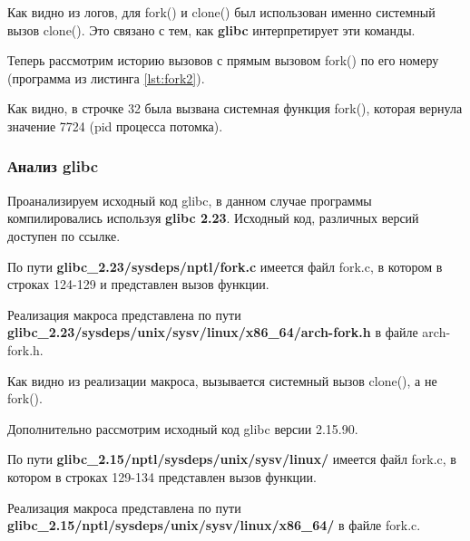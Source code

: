 Как видно из логов, для fork() и clone() был использован именно системный вызов clone(). Это связано с тем, как \textbf{glibc} интерпретирует эти команды. 

Теперь рассмотрим историю вызовов с прямым вызовом fork() по его номеру (программа из листинга \ref{lst:fork2}).

Как видно, в строчке 32 была вызвана системная функция fork(), которая вернула значение 7724 (pid процесса потомка).

\subsubsection{Анализ glibc}

Проанализируем исходный код glibc, в данном случае программы компилировались используя \textbf{glibc 2.23}. Исходный код, различных версий доступен по ссылке\cite{glibc}.

По пути \textbf{glibc\_2.23/sysdeps/nptl/fork.c} имеется файл fork.c, в котором в строках 124-129 и представлен вызов функции.

Реализация макроса представлена по пути \textbf{glibc\_2.23/sysdeps/unix/sysv/linux/x86\_64/arch-fork.h} в файле arch-fork.h.


Как видно из реализации макроса, вызывается системный вызов clone(), а не fork().

Дополнительно рассмотрим исходный код glibc версии 2.15.90.

По пути \textbf{glibc\_2.15/nptl/sysdeps/unix/sysv/linux/} имеется файл fork.c, в котором в строках 129-134 представлен вызов функции.



Реализация макроса представлена по пути \textbf{glibc\_2.15/nptl/sysdeps/unix/sysv/linux/x86\_64/} в файле fork.c.





